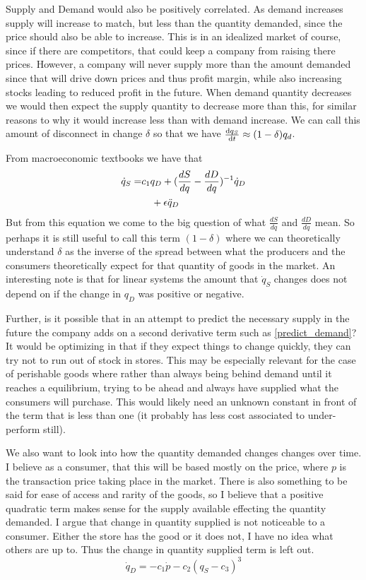 \documentclass{article}
\begin{document}
Supply and Demand would also be positively correlated. As demand increases supply will increase to match, but less than the quantity demanded, since the price should also be able to increase. This is in an idealized market of course, since if there are competitors, that could keep a company from raising there prices. However, a company will never supply more than the amount demanded since that will drive down prices and thus profit margin, while also increasing stocks leading to reduced profit in the future. When demand quantity decreases we would then expect the supply quantity to decrease more than this, for similar reasons to why it would increase less than with demand increase. We can call this amount of disconnect in change $\delta$ so that we have $\frac{\mathrm{d} q_S}{\mathrm{d} t} \approx (1-\delta)q_d$.

From macroeconomic textbooks we have that 
\begin{align}
	\dot{q}_S = &  c_1 q_D + (\frac{dS}{dq} - \frac{dD}{dq})^{-1}\dot{q}_D \\
	& \ \ \ +\eps\ddot{q}_D %
\end{align}
But from this equation we come to the big question of what $\frac{dS}{dq}$ and $\frac{dD}{dq}$ mean. So perhaps it is still useful to call this term $(1-\delta)$ where we can theoretically understand $\delta$ as the inverse of the spread between what the producers and the consumers theoretically expect for that quantity of goods in the market. An interesting note is that for linear systems the amount that $\dot{q}_S$ changes does not depend on if the change in $q_D$ was positive or negative.

Further, is it possible that in an attempt to predict the necessary supply in the future the company adds on a second derivative term such as \eqref{predict_demand}? 
It would be optimizing in that if they expect things to change quickly, they can try not to run out of stock in stores. This may be especially relevant for the case of perishable goods where rather than always being behind demand until it reaches a equilibrium, trying to be ahead and always have supplied what the consumers will purchase. This would likely need an unknown constant in front of the term that is less than one (it probably has less cost associated to under-perform still). 

We also want to look into how the quantity demanded changes changes over time. I believe as a consumer, that this will be based mostly on the price, where $p$ is the transaction price taking place in the market. There is also something to be said for ease of access and rarity of the goods, so I believe that a positive quadratic term makes sense for the supply available effecting the quantity demanded. I argue that change in quantity supplied is not noticeable to a consumer. Either the store has the good or it does not, I have no idea what others are up to. Thus the change in quantity supplied term is left out. 
\begin{equation}
		\dot{q}_D = - c_1 \dot{p} - c_2(q_S-c_3)^3
\end{equation}
\end{document}
